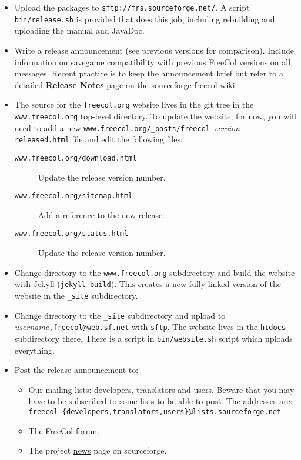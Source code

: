 \documentclass[12pt]{book}
\begin{document}
\begin{itemize}
\item Upload the packages to \verb+sftp://frs.sourceforge.net/+. A
  script \verb|bin/release.sh| is provided that does this job,
  including rebuilding and uploading the manual and JavaDoc. 

\item Write a release announcement (see previous versions for
  comparison). Include information on savegame compatibility with
  previous FreeCol versions on all messages. Recent practice is to
  keep the announcement brief but refer to a detailed \textbf{Release Notes}
  page on the sourceforge freecol wiki.

\item The source for the \texttt{freecol.org} website lives in the git
  tree in the \texttt{www.freecol.org} top-level directory. To update
  the website, for now, you will need to add a new
  \texttt{www.freecol.org/\_posts/freecol-}\emph{version}\texttt{-released.html}
  file and edit the following files:
  \begin{description}
  \item[\texttt{www.freecol.org/download.html}] Update the release
    version number.
  \item[\texttt{www.freecol.org/sitemap.html}] Add a reference to the
    new release.
  \item[\texttt{www.freecol.org/status.html}] Update the release
    version number.
  \end{description}

\item Change directory to the \texttt{www.freecol.org} subdirectory
  and build the website with Jekyll (\texttt{jekyll build}).  This
  creates a new fully linked version of the website in the
  \texttt{\_site} subdirectory.

\item Change directory to the \texttt{\_site} subdirectory and upload
  to \emph{username}\texttt{,freecol@web.sf.net} with \texttt{sftp}.
  The website lives in the \texttt{htdocs} subdirectory there.  There
  is a script in \verb|bin/website.sh| script which uploads everything.

\item Post the release announcement to:
  \begin{itemize}
    \item Our mailing lists: developers, translators and users.
      Beware that you may have to be subscribed to some lists to be
      able to post. The addresses are:
      \texttt{freecol-\{developers,translators,users\}@lists.sourceforge.net}
    \item The FreeCol
      \href{https://sourceforge.net/p/freecol/discussion/141200/}{forum}.
    \item The project
      \href{https://sourceforge.net/p/freecol/news/}{news} page on sourceforge.
  \end{itemize}


\end{itemize}
\end{document}
